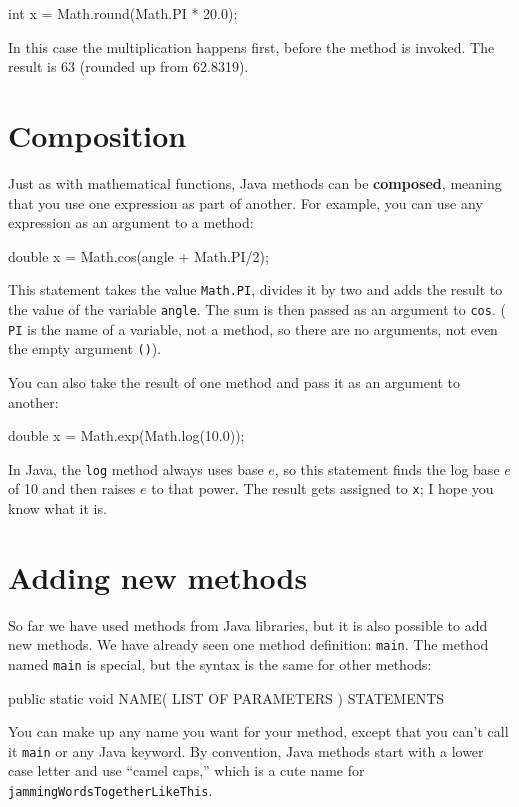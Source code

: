 \begin{code}
    int x = Math.round(Math.PI * 20.0);
\end{code}
%
In this case the multiplication happens first, before the
method is invoked.  The result is 63 (rounded up from 62.8319).


\section{Composition}
\label{composition}

Just as with mathematical functions, Java methods can be {\bf
composed}, meaning that you use one expression as part of another.
For example, you can use any expression as an argument to a method:

\begin{code}
    double x = Math.cos(angle + Math.PI/2);
\end{code}
%
This statement takes the value {\tt Math.PI}, divides it by two and
adds the result to the value of the variable {\tt angle}.  The sum is
then passed as an argument to {\tt cos}. ({\tt
PI} is the name of a variable, not a method, so there are no
arguments, not even the empty argument {\tt()}).

You can also take the result of one method and pass it as
an argument to another:

\begin{code}
    double x = Math.exp(Math.log(10.0));
\end{code}
%
In Java, the {\tt log} method always uses base $e$, so this
statement finds the log base $e$ of 10 and then raises $e$ to that
power.  The result gets assigned to {\tt x}; I hope you know what it
is.

\section{Adding new methods}
\label{adding_methods}

So far we have used methods from Java libraries,
but it is also possible to add new methods.  We have already
seen one method definition: {\tt main}.  The method named {\tt main}
is special, but the syntax is the same for other methods:

\begin{code}
  public static void NAME( LIST OF PARAMETERS ) {
    STATEMENTS
  }
\end{code}
%
You can make up any name you want for your method, except
that you can't call it {\tt main} or any
Java keyword.  By convention, Java methods start with a lower
case letter and use ``camel caps,'' which is a cute name for
{\tt jammingWordsTogetherLikeThis}.

